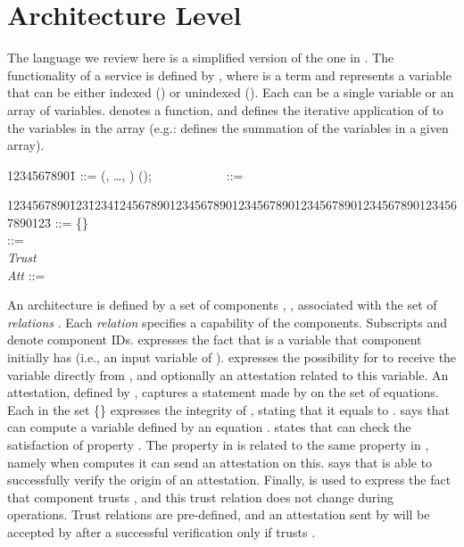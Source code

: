 \documentclass{llncs}
\begin{document}
\section{Architecture Level}
\label{sec:architectures}

The language we review here is a simplified version of the one in \cite{TM-STM2014}.  
The functionality of a service is defined by , where  is a term 
and  represents a variable that can 
be either indexed () or unindexed (). Each  can be a single variable or an array of 
variables.  denotes a function, and 
 defines the iterative application of  to the variables in 
the array  (e.g.:  defines the summation of the variables in a given array). 

\small
\begin{tabbing}
    12345678901\= \kill
    \>  ::=   (, \dots, )   ();\ \ \ \ \ \ \ \ \ \ \ \  ::=   
\end{tabbing}
\normalsize

\small
\begin{tabbing}
    1234567890\=123\=1234\=12456789012345678901234567890123456789012345678901234567890123\= \kill
    \>  \> ::= \> \{\}\\
    \>  \> ::= \>     \\
    \>\>\>      \textit{Trust}\\ 
    \> \textit{Att} \> ::= \> 
\end{tabbing}
\normalsize

An architecture  is 
defined by a set of components , ,  
associated with the set of \textit{relations} . Each 
\textit{relation}  specifies a capability of the components. 
Subscripts  and  denote component IDs.   expresses the 
fact that  is a variable that component  initially has (i.e., an input variable of ). 
 expresses the possibility for  
to receive the variable  directly from , and optionally an attestation 
related to this variable. An attestation, defined by , 
captures a statement made by  on the set of equations. Each    in the 
set \{\} expresses the integrity of , stating that it equals to . 
 says that  can compute a variable defined by an 
equation   .  states 
that  can check the satisfaction of property . The property 
   in  is related to the same property in 
, namely when  computes    it can send an 
attestation on this.  says 
that  is able to successfully verify the origin of an attestation. Finally, 
 is used to express the fact that component  trusts , and 
this trust relation does not change during operations. Trust relations are pre-defined, 
and an attestation sent by  will be accepted by  after a successful verification  
only if  trusts . 
 
\end{document}
